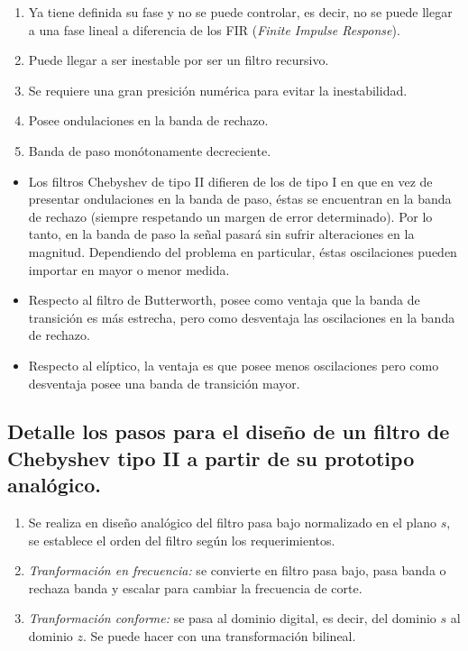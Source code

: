 \documentclass[a4paper,10pt,spanish,oneside]{article}
\begin{document}
\begin{enumerate}[(-)]
\item Ya tiene definida su fase y no se puede controlar, es decir, no se puede llegar a una
fase lineal a diferencia de los FIR (\textit{Finite Impulse Response}).
\item Puede llegar a ser inestable por ser un filtro recursivo.
\item Se requiere una gran presición numérica para evitar la inestabilidad.
\item Posee ondulaciones en la banda de rechazo.
\item Banda de paso monótonamente decreciente.
\end{enumerate}

\begin{itemize}
\item Los filtros Chebyshev de tipo II difieren de los de tipo I en que en vez de presentar ondulaciones en la banda de paso, éstas se encuentran en la banda de rechazo (siempre respetando un margen de error determinado). Por lo tanto, en la banda de paso la señal pasará sin sufrir alteraciones en la magnitud. Dependiendo del problema en particular, éstas oscilaciones pueden importar en mayor o menor medida.

\item Respecto al filtro de Butterworth, posee como ventaja que la banda de transición es más estrecha, pero como desventaja las oscilaciones en la banda de rechazo.

\item Respecto al elíptico, la ventaja es que posee menos oscilaciones pero como desventaja posee una banda de transición mayor.
\end{itemize}

\subsection{Detalle los pasos para el diseño de un filtro de Chebyshev tipo II a partir de su prototipo analógico.}

\begin{enumerate}[1.]
\item Se realiza en diseño analógico del filtro pasa bajo normalizado en el plano $s$, se establece el orden del filtro según los requerimientos.

\item \textit{Tranformación en frecuencia:} se convierte en filtro pasa bajo, pasa banda o rechaza banda y escalar para cambiar la frecuencia de corte.

\item \textit{Tranformación conforme:} se pasa al dominio digital, es decir, del dominio $s$ al dominio $z$. Se puede hacer con una transformación bilineal.
\end{enumerate}
\end{document}
